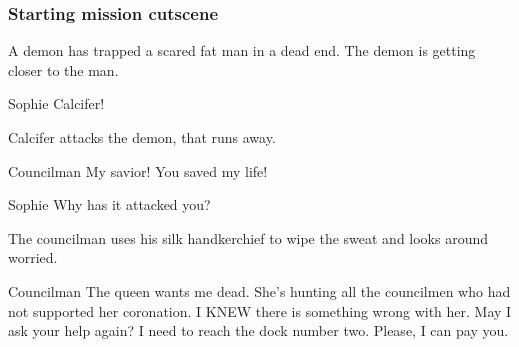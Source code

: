 \subsubsection*{Starting mission cutscene}
\begin{screenplay}

A demon has trapped a scared fat man in a dead end. The demon is getting closer to the man.

\begin{dialogue}{Sophie}
Calcifer!
\end{dialogue}

Calcifer attacks the demon, that runs away.

\begin{dialogue}[grateful]{Councilman}
My savior! You saved my life!
\end{dialogue}

\begin{dialogue}{Sophie}
Why has it attacked you?
\end{dialogue}

The councilman uses his silk handkerchief to wipe the sweat and looks around worried.

\begin{dialogue}{Councilman}
The queen wants me dead. She's hunting all the councilmen who had not supported her coronation. I KNEW there is something wrong with her. May I ask your help again? I need to reach the dock number two. Please, I can pay you.
\end{dialogue}

\end{screenplay}

